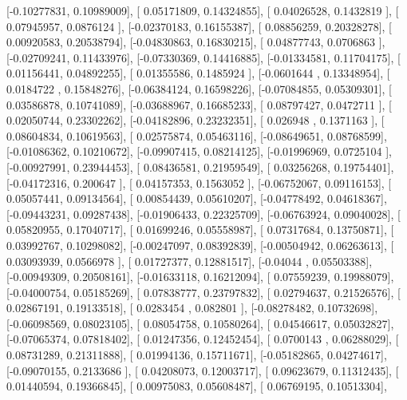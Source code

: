 \documentclass{article}
\begin{document}
       [-0.10277831,  0.10989009],
       [ 0.05171809,  0.14324855],
       [ 0.04026528,  0.1432819 ],
       [ 0.07945957,  0.0876124 ],
       [-0.02370183,  0.16155387],
       [ 0.08856259,  0.20328278],
       [ 0.00920583,  0.20538794],
       [-0.04830863,  0.16830215],
       [ 0.04877743,  0.0706863 ],
       [-0.02709241,  0.11433976],
       [-0.07330369,  0.14416885],
       [-0.01334581,  0.11704175],
       [ 0.01156441,  0.04892255],
       [ 0.01355586,  0.1485924 ],
       [-0.0601644 ,  0.13348954],
       [ 0.0184722 ,  0.15848276],
       [-0.06384124,  0.16598226],
       [-0.07084855,  0.05309301],
       [ 0.03586878,  0.10741089],
       [-0.03688967,  0.16685233],
       [ 0.08797427,  0.0472711 ],
       [ 0.02050744,  0.23302262],
       [-0.04182896,  0.23232351],
       [ 0.026948  ,  0.1371163 ],
       [ 0.08604834,  0.10619563],
       [ 0.02575874,  0.05463116],
       [-0.08649651,  0.08768599],
       [-0.01086362,  0.10210672],
       [-0.09907415,  0.08214125],
       [-0.01996969,  0.0725104 ],
       [-0.00927991,  0.23944453],
       [ 0.08436581,  0.21959549],
       [ 0.03256268,  0.19754401],
       [-0.04172316,  0.200647  ],
       [ 0.04157353,  0.1563052 ],
       [-0.06752067,  0.09116153],
       [ 0.05057441,  0.09134564],
       [ 0.00854439,  0.05610207],
       [-0.04778492,  0.04618367],
       [-0.09443231,  0.09287438],
       [-0.01906433,  0.22325709],
       [-0.06763924,  0.09040028],
       [ 0.05820955,  0.17040717],
       [ 0.01699246,  0.05558987],
       [ 0.07317684,  0.13750871],
       [ 0.03992767,  0.10298082],
       [-0.00247097,  0.08392839],
       [-0.00504942,  0.06263613],
       [ 0.03093939,  0.0566978 ],
       [ 0.01727377,  0.12881517],
       [-0.04044   ,  0.05503388],
       [-0.00949309,  0.20508161],
       [-0.01633118,  0.16212094],
       [ 0.07559239,  0.19988079],
       [-0.04000754,  0.05185269],
       [ 0.07838777,  0.23797832],
       [ 0.02794637,  0.21526576],
       [ 0.02867191,  0.19133518],
       [ 0.0283454 ,  0.082801  ],
       [-0.08278482,  0.10732698],
       [-0.06098569,  0.08023105],
       [ 0.08054758,  0.10580264],
       [ 0.04546617,  0.05032827],
       [-0.07065374,  0.07818402],
       [ 0.01247356,  0.12452454],
       [ 0.0700143 ,  0.06288029],
       [ 0.08731289,  0.21311888],
       [ 0.01994136,  0.15711671],
       [-0.05182865,  0.04274617],
       [-0.09070155,  0.2133686 ],
       [ 0.04208073,  0.12003717],
       [ 0.09623679,  0.11312435],
       [ 0.01440594,  0.19366845],
       [ 0.00975083,  0.05608487],
       [ 0.06769195,  0.10513304],
\end{document}
